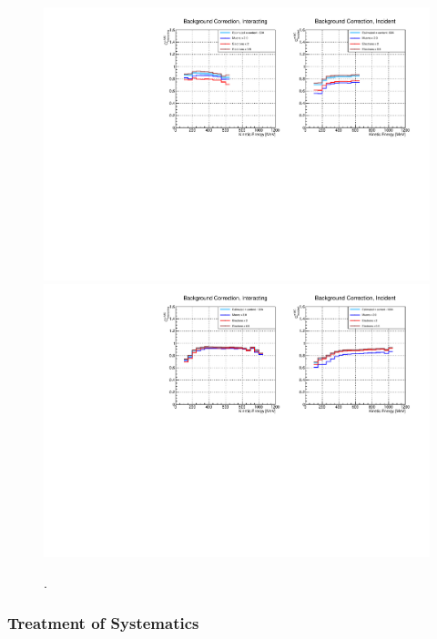 \begin{figure}[htb]
\centering
\includegraphics[width=\textwidth]{Chapter-6/Images/Bkg60A_inc_int.pdf}
\includegraphics[width=\textwidth]{Chapter-6/Images/Bkg100A_inc_int.pdf}
\caption{.}
\label{fig:BkgCorr}
\end{figure}



\subsubsection{Treatment of Systematics}


